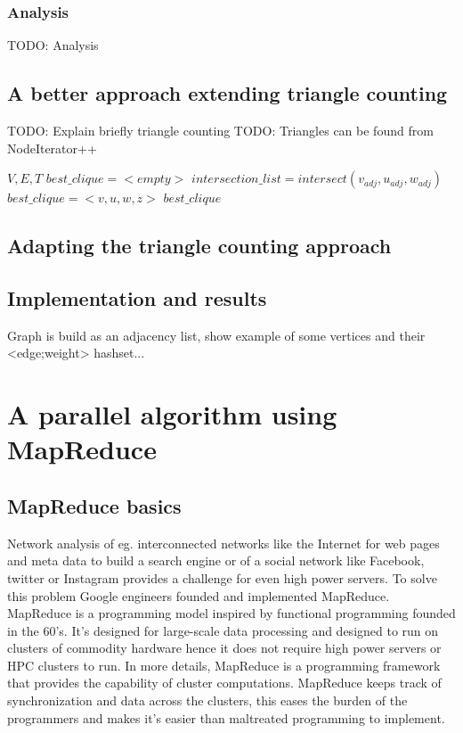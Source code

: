 \documentclass{article}
\begin{document}
\subsubsection{Analysis}
TODO: Analysis

\subsection{A better approach extending triangle counting}
TODO: Explain briefly triangle counting
TODO: Triangles can be found from NodeIterator++

\begin{algorithm}
\caption{$4clique\_iterator+$}
\begin{algorithmic}
\REQUIRE $V,E,T$
\STATE $best\_clique = <empty>$
\STATE $intersection\_list = intersect(v_{adj}, u_{adj}, w_{adj})$
\STATE $best\_clique = <v,u,w,z>$
\ENDIF
\ENDFOR
\ENDIF
\ENDFOR
\RETURN $best\_clique$
\end{algorithmic}
\end{algorithm}

\subsection{Adapting the triangle counting approach}

\subsection{Implementation and results}
Graph is build as an adjacency list, show example of some vertices and their <edge;weight> hashset...

\section{A parallel algorithm using MapReduce}

\subsection{MapReduce basics}
Network analysis of eg. interconnected networks like the Internet for web pages and meta data to build a search engine or of a social network like Facebook, twitter or Instagram provides a challenge for even high power servers. To solve this problem Google engineers founded and implemented MapReduce. MapReduce is a programming model inspired by functional programming founded in the 60's. It's designed for large-scale data processing and designed to run on clusters of commodity hardware hence it does not require high power servers or HPC clusters to run.
In more details, MapReduce is a programming framework that provides the capability of cluster computations. MapReduce keeps track of synchronization and data across the clusters, this eases the burden of the programmers and makes it's easier than maltreated programming to implement.
\end{document}
